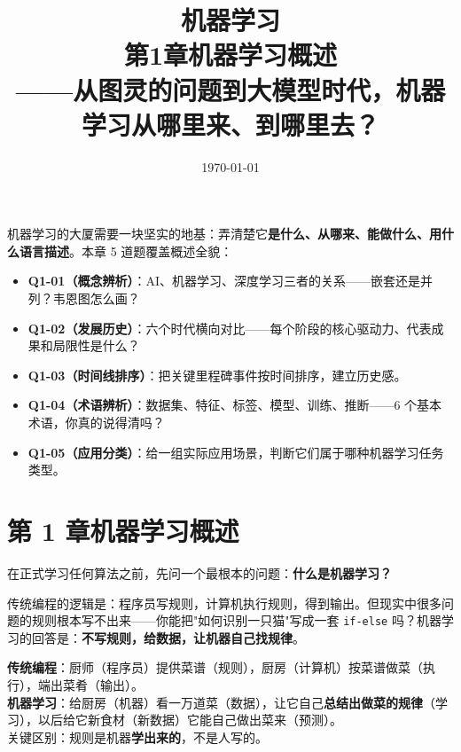 \documentclass[a4paper,11pt]{ctexart}
\title{\textbf{机器学习\\第1章\quad 机器学习概述}\\[0.5em]
{\large\color{gray}——从图灵的问题到大模型时代，机器学习从哪里来、到哪里去？}}
\date{\today}
\begin{document}
\maketitle

\begin{beginnerbox}
    机器学习的大厦需要一块坚实的地基：弄清楚它\textbf{是什么、从哪来、能做什么、用什么语言描述}。本章 5 道题覆盖概述全貌：
    \begin{itemize}
        \item \textbf{Q1-01（概念辨析）}：AI、机器学习、深度学习三者的关系——嵌套还是并列？韦恩图怎么画？
        \item \textbf{Q1-02（发展历史）}：六个时代横向对比——每个阶段的核心驱动力、代表成果和局限性是什么？
        \item \textbf{Q1-03（时间线排序）}：把关键里程碑事件按时间排序，建立历史感。
        \item \textbf{Q1-04（术语辨析）}：数据集、特征、标签、模型、训练、推断——6 个基本术语，你真的说得清吗？
        \item \textbf{Q1-05（应用分类）}：给一组实际应用场景，判断它们属于哪种机器学习任务类型。
    \end{itemize}
\end{beginnerbox}

\section{第 1 章\quad 机器学习概述}

在正式学习任何算法之前，先问一个最根本的问题：\textbf{什么是机器学习？}

传统编程的逻辑是：程序员写规则，计算机执行规则，得到输出。但现实中很多问题的规则根本写不出来——你能把"如何识别一只猫"写成一套 \texttt{if-else} 吗？机器学习的回答是：\textbf{不写规则，给数据，让机器自己找规律}。

\begin{metaphorbox}
    \textbf{传统编程}：厨师（程序员）提供菜谱（规则），厨房（计算机）按菜谱做菜（执行），端出菜肴（输出）。\\
    \textbf{机器学习}：给厨房（机器）看一万道菜（数据），让它自己\textbf{总结出做菜的规律}（学习），以后给它新食材（新数据）它能自己做出菜来（预测）。\\
    关键区别：规则是机器\textbf{学出来的}，不是人写的。
\end{metaphorbox}
\end{document}
